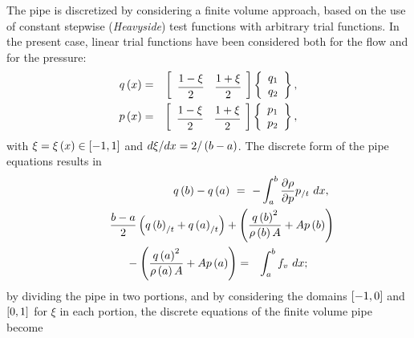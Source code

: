 \documentclass[10pt,dvips,fleqn,subeqn]{report}
\begin{document}
The pipe is discretized by considering a finite volume approach, based on
the use of constant stepwise ({\em Heavyside}) test functions with arbitrary
trial functions.
In the present case, linear trial functions have been considered both for
the flow and for the pressure:
\begin{eqnarray*}
    q\plbr{x} & = & \sqbr{\matr{cc}{
        \cfrac{1 - \xi}{2} &
        \cfrac{1 + \xi}{2}
    }}\cubr{\cvvect{
        q_1 \\
        q_2
    }} , \\
    p\plbr{x} & = & \sqbr{\matr{cc}{
        \cfrac{1 - \xi}{2} &
        \cfrac{1 + \xi}{2}
    }}\cubr{\cvvect{
        p_1 \\
        p_2
    }} ,
\end{eqnarray*}
with $\xi=\xi\plbr{x}\in\sqbr{-1,1}$ and $d\xi/dx=2/\plbr{b-a}$.
The discrete form of the pipe equations results in
\begin{eqnarray*}
    \lefteqn{
        q\plbr{b} - q\plbr{a} \ = \
        - \intg{a}{b}{\frac{\partial\rho}{\partial{p}}p_{/t}}{dx} ,
    } \hspace{20mm} \\
    \lefteqn{
        \frac{b-a}{2}\plbr{
            q\plbr{b}_{/t} + q\plbr{a}_{/t}
        } + \plbr{
            \frac{q\plbr{b}^2}{\rho\plbr{b} A} + A p\plbr{b}
        }
    } \hspace{40mm} \\
    \mbox{} - \plbr{
        \frac{q\plbr{a}^2}{\rho\plbr{a} A} + A p\plbr{a}
    } & = & \intg{a}{b}{f_v}{dx} ;
\end{eqnarray*}
by dividing the pipe in two portions, and by considering the domains
$\sqbr{-1,0}$ and $\sqbr{0,1}$ for $\xi$ in each portion, the discrete
equations of the finite volume pipe become
\end{document}
